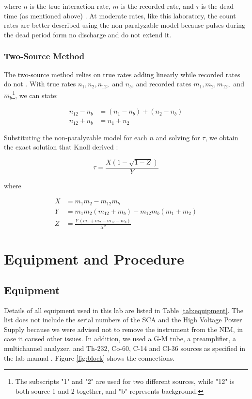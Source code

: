 \documentclass[12pt]{article}
\begin{document}
where $n$ is the true interaction rate, $m$ is the recorded rate, and $\tau$ is the dead time (as mentioned above) \cite{knoll}. At moderate rates, like this laboratory, the count rates are better described using the non-paralyzable model because pulses during the dead period form no discharge and do not extend it.

\subsubsection{Two-Source Method}
\label{subsubsec:twosource}

The two-source method relies on true rates adding linearly while recorded rates do not \cite{knoll}. With true rates $n_1, n_2, n_{12},$ and $n_b$, and recorded rates $m_1, m_2, m_{12},$ and $m_b$\footnote{The subscripts "1" and "2" are used for two different sources, while "12" is both source 1 and 2 together, and "b" represents background.}, we can state:

\begin{align}
    n_{12} - n_b &= (n_1 - n_b) + (n_2 - n_b) \nonumber \\
    n_{12} + n_b &= n_1 + n_2
\end{align}

Substituting the non-paralyzable model for each $n$ and solving for $\tau$, we obtain the exact solution that Knoll derived \cite{knoll}:

\begin{equation}
    \tau = \frac{X\left(1-\sqrt{1-Z}\right)}{Y}
\end{equation}

where

\begin{align*}
    X &= m_1 m_2 - m_{12} m_b \\
    Y &= m_1 m_2 (m_{12} + m_b) - m_{12} m_b (m_1 + m_2) \\
    Z &= \frac{Y\,(m_1 + m_2 - m_{12} - m_b)}{X^{2}}
\end{align*}


\section{Equipment and Procedure}

\subsection{Equipment}

Details of all equipment used in this lab are listed in Table \ref{tab:equipment}. The list does not include the serial numbers of the SCA and the High Voltage Power Supply because we were advised not to remove the instrument from the NIM, in case it caused other issues. In addition, we used a G-M tube, a preamplifier, a multichannel analyzer, and Th-232, Co-60, C-14 and Cl-36 sources as specified in the lab manual \cite{labmanual}. Figure \ref{fig:block} shows the connections.
\end{document}
